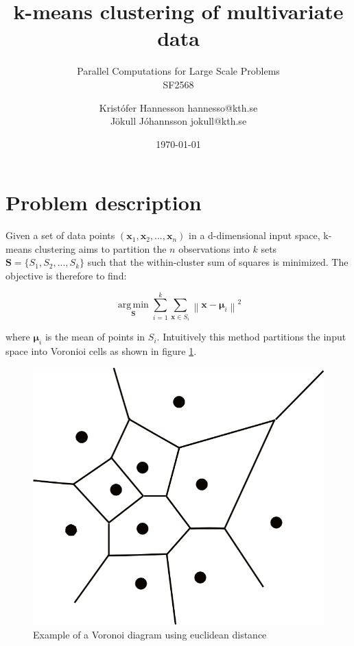 \documentclass[parskip=true]{scrartcl}
\title{k-means clustering of multivariate data}
\subtitle{Parallel Computations for Large Scale Problems\\ SF2568}
\author{Kristófer Hannesson hannesso@kth.se\\Jökull Jóhannsson jokull@kth.se}
\date{\today}
\begin{document}
\maketitle

\section{Problem description}

Given a set of data points $(\bm{x}_1, \bm{x}_2, ..., \bm{x}_n)$ in a d-dimensional input space, k-means clustering aims to partition the $n$ observations into $k$ sets $\bm{S} = \{S_1, S_2, ..., S_k\}$ such that the within-cluster sum of squares is minimized. The objective is therefore to find:

\begin{equation}
    \underset{\mathbf{S}} {\operatorname{arg\,min}}  \sum_{i=1}^{k} \sum_{\mathbf x \in S_i} \left\| \mathbf x - \boldsymbol\mu_i \right\|^2 
\end{equation}

where $\boldsymbol\mu_i$ is the mean of points in $S_i$. Intuitively this method partitions the input space into Voronioi cells as shown in figure \ref{fig:voronoi}.

\begin{figure}[h]
    \centering
    \includegraphics[scale=0.15]{voronoi}
    \caption{Example of a Voronoi diagram using euclidean distance\cite{voronoi}}
    \label{fig:voronoi}
\end{figure}
\end{document}
